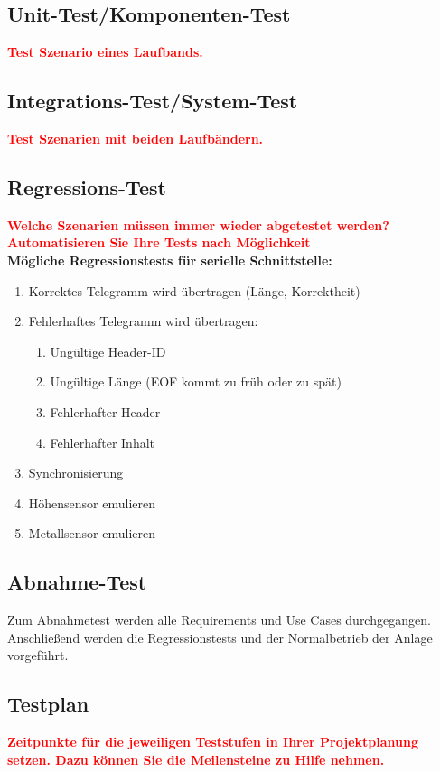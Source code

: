 \documentclass[oneside,a4paper,titlepage]{scrartcl} %
\begin{document}
\subsection{Unit-Test/Komponenten-Test}
\textcolor{red}{\textbf{Test Szenario eines Laufbands.}}

\subsection{Integrations-Test/System-Test}
\textcolor{red}{\textbf{Test Szenarien mit beiden Laufbändern.}}

\subsection{Regressions-Test}
\textcolor{red}{\textbf{Welche Szenarien müssen immer wieder abgetestet werden? Automatisieren Sie Ihre Tests nach
Möglichkeit}}\\
\newline
\textbf{Mögliche Regressionstests für serielle Schnittstelle:}\\
\begin{enumerate}
 \item Korrektes Telegramm wird übertragen (Länge, Korrektheit)
 \item Fehlerhaftes Telegramm wird übertragen:
 \begin{enumerate}
  \item Ungültige Header-ID
  \item Ungültige Länge (EOF kommt zu früh oder zu spät)
  \item Fehlerhafter Header
  \item Fehlerhafter Inhalt
 \end{enumerate}
 \item Synchronisierung
 \item Höhensensor emulieren
 \item Metallsensor emulieren
\end{enumerate}

\subsection{Abnahme-Test}
Zum Abnahmetest werden alle Requirements und Use Cases durchgegangen. Anschließend werden
die Regressionstests und der Normalbetrieb der Anlage vorgeführt.

\subsection{Testplan}
\textcolor{red}{\textbf{Zeitpunkte für die jeweiligen Teststufen in Ihrer Projektplanung setzen.
Dazu können Sie die Meilensteine zu Hilfe nehmen.}}
\end{document}
